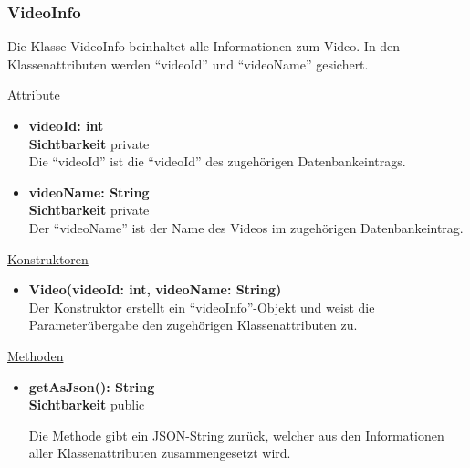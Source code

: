 \subsubsection{VideoInfo}
Die Klasse VideoInfo beinhaltet alle Informationen zum Video. In den Klassenattributen werden ``videoId'' und ``videoName'' gesichert. \newline

\underline{Attribute}
\begin{itemize}
\itemsep0pt
\item \textbf{videoId: int} \hfill\\ 
\textbf{Sichtbarkeit} private \hfill\\  

Die ``videoId'' ist die ``videoId'' des zugehörigen Datenbankeintrags.

\item \textbf{videoName: String} \hfill\\ 
\textbf{Sichtbarkeit} private \hfill\\ 

Der ``videoName'' ist der Name des Videos im zugehörigen Datenbankeintrag.

\end{itemize}

\underline{Konstruktoren}
\begin{itemize}
\itemsep0pt
\item \textbf{Video(videoId: int, videoName: String)} \hfill\\

Der Konstruktor erstellt ein ``videoInfo''-Objekt und weist die Parameterübergabe den zugehörigen Klassenattributen zu.

\end{itemize}

\underline{Methoden}
\begin{itemize}
\itemsep0pt
\item \textbf{getAsJson(): String}\hfill\\
\textbf{Sichtbarkeit} public

Die Methode gibt ein JSON-String zurück, welcher aus den Informationen aller Klassenattributen zusammengesetzt wird.

\end{itemize}